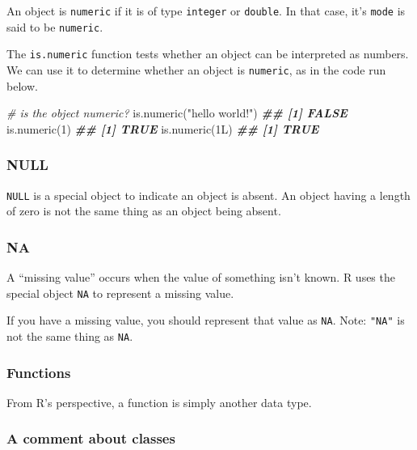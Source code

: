 \documentclass[
]{book}
\newenvironment{Shaded}{\begin{snugshade}}{\end{snugshade}}
\newcommand{\CommentTok}[1]{\textcolor[rgb]{0.56,0.35,0.01}{\textit{#1}}}
\newcommand{\DecValTok}[1]{\textcolor[rgb]{0.00,0.00,0.81}{#1}}
\newcommand{\DocumentationTok}[1]{\textcolor[rgb]{0.56,0.35,0.01}{\textbf{\textit{#1}}}}
\newcommand{\FunctionTok}[1]{\textcolor[rgb]{0.00,0.00,0.00}{#1}}
\newcommand{\NormalTok}[1]{#1}
\newcommand{\StringTok}[1]{\textcolor[rgb]{0.31,0.60,0.02}{#1}}
\theoremstyle{definition}
\theoremstyle{definition}
\theoremstyle{definition}
\theoremstyle{definition}
\theoremstyle{remark}
\begin{document}
An object is \texttt{numeric} if it is of type \texttt{integer} or \texttt{double}. In that case, it's \texttt{mode} is said to be \texttt{numeric}.

The \texttt{is.numeric} function tests whether an object can be interpreted as numbers. We can use it to determine whether an object is \texttt{numeric}, as in the code run below.

\begin{Shaded}
\begin{Highlighting}[]
\CommentTok{\# is the object numeric?}
\FunctionTok{is.numeric}\NormalTok{(}\StringTok{"hello world!"}\NormalTok{)}
\DocumentationTok{\#\# [1] FALSE}
\FunctionTok{is.numeric}\NormalTok{(}\DecValTok{1}\NormalTok{)}
\DocumentationTok{\#\# [1] TRUE}
\FunctionTok{is.numeric}\NormalTok{(1L)}
\DocumentationTok{\#\# [1] TRUE}
\end{Highlighting}
\end{Shaded}

\hypertarget{null}{%
\subsubsection{NULL}\label{null}}

\texttt{NULL} is a special object to indicate an object is absent. An object having a length of zero is not the same thing as an object being absent.

\hypertarget{na}{%
\subsubsection{NA}\label{na}}

A ``missing value'' occurs when the value of something isn't known. R uses the special object \texttt{NA} to represent a missing value.

If you have a missing value, you should represent that value as \texttt{NA}. Note: \texttt{"NA"} is not the same thing as \texttt{NA}.

\hypertarget{functions-1}{%
\subsubsection{Functions}\label{functions-1}}

From R's perspective, a function is simply another data type.

\hypertarget{a-comment-about-classes}{%
\subsubsection{A comment about classes}\label{a-comment-about-classes}}
\end{document}
